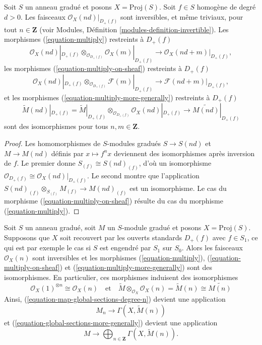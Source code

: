 \begin{lemma}
\label{lemma-when-invertible}
Soit $S$ un anneau gradué et posons $X = \text{Proj}(S)$. Soit
$f \in S$ homogène de degré $d > 0$. Les faisceaux
$\mathcal{O}_X(nd)|_{D_{+}(f)}$ sont inversibles, et même triviaux, pour tout
$n \in \mathbf{Z}$ (voir Modules,
Définition \ref{modules-definition-invertible}). Les morphismes
(\ref{equation-multiply}) restreints à $D_{+}(f)$
$$
\mathcal{O}_X(nd)|_{D_{+}(f)} \otimes_{\mathcal{O}_{D_{+}(f)}}
\mathcal{O}_X(m)|_{D_{+}(f)}
\longrightarrow
\mathcal{O}_X(nd + m)|_{D_{+}(f)},
$$
les morphismes (\ref{equation-multiply-on-sheaf}) restreints à $D_+(f)$
$$
\mathcal{O}_X(nd)|_{D_{+}(f)} \otimes_{\mathcal{O}_{D_{+}(f)}}
\mathcal{F}(m)|_{D_{+}(f)}
\longrightarrow
\mathcal{F}(nd + m)|_{D_{+}(f)},
$$
et les morphismes (\ref{equation-multiply-more-generally}) restreints à
$D_{+}(f)$
$$
\widetilde M(nd)|_{D_{+}(f)}
=
\widetilde M|_{D_{+}(f)}
\otimes_{\mathcal{O}_{D_{+}(f)}}
\mathcal{O}_X(nd)|_{D_{+}(f)}
\longrightarrow
\widetilde{M(nd)}|_{D_{+}(f)}
$$
sont des isomorphismes pour tous $n, m \in \mathbf{Z}$.
\end{lemma}

\begin{proof}
Les homomorphismes de $S$-modules gradués $S \to S(nd)$ et
$M \to M(nd)$ définis par $x \mapsto f^n x$ deviennent des isomorphismes
après inversion de $f$. Le premier donne
$S_{(f)} \cong S(nd)_{(f)}$, d'où un isomorphisme
$\mathcal{O}_{D_{+}(f)} \cong \mathcal{O}_X(nd)|_{D_{+}(f)}$.
Le second montre que l'application
$S(nd)_{(f)} \otimes_{S_{(f)}} M_{(f)} \to M(nd)_{(f)}$ est un isomorphisme.
Le cas du morphisme (\ref{equation-multiply-on-sheaf}) résulte du cas du
morphisme (\ref{equation-multiply}).
\end{proof}

\begin{lemma}
\label{lemma-apply-modules}
Soit $S$ un anneau gradué, soit $M$ un $S$-module gradué et posons
$X = \text{Proj}(S)$. Supposons que $X$ soit recouvert par les ouverts
standards $D_+(f)$ avec $f \in S_1$, ce qui est par exemple le cas si $S$ est
engendré par $S_1$ sur $S_0$. Alors les faisceaux $\mathcal{O}_X(n)$ sont
inversibles et les morphismes (\ref{equation-multiply}),
(\ref{equation-multiply-on-sheaf}) et
(\ref{equation-multiply-more-generally}) sont des isomorphismes.
En particulier, ces morphismes induisent des isomorphismes
$$
\mathcal{O}_X(1)^{\otimes n} \cong
\mathcal{O}_X(n)
\quad
\text{et}
\quad
\widetilde{M} \otimes_{\mathcal{O}_X} \mathcal{O}_X(n) =
\widetilde{M}(n) \cong \widetilde{M(n)}
$$
Ainsi, (\ref{equation-map-global-sections-degree-n}) devient une application
\begin{equation}
\label{equation-map-global-sections-degree-n-simplified}
M_n \longrightarrow \Gamma(X, \widetilde{M}(n))
\end{equation}
et (\ref{equation-global-sections-more-generally}) devient une application
\begin{equation}
\label{equation-global-sections-more-generally-simplified}
M \longrightarrow
\bigoplus\nolimits_{n \in \mathbf{Z}} \Gamma(X, \widetilde{M}(n)).
\end{equation}
\end{lemma}

